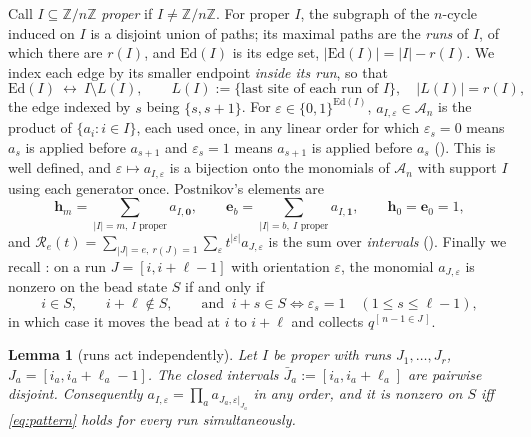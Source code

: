 \documentclass[11pt]{article}
\theoremstyle{plain}
\newtheorem{lemma}[theorem]{Lemma}
\theoremstyle{definition}
\newcommand{\A}{\mathscr{A}}
\newcommand{\ZZ}{\mathbb{Z}}
\newcommand{\bh}{\mathbf h}
\newcommand{\be}{\mathbf e}
\begin{document}
Call $I\subseteq\ZZ/n\ZZ$ \emph{proper} if $I\ne\ZZ/n\ZZ$.  For proper $I$, the
subgraph of the $n$-cycle induced on $I$ is a disjoint union of paths; its
maximal paths are the \emph{runs} of $I$, of which there are $r(I)$, and
$\mathrm{Ed}(I)$ is its edge set, $|\mathrm{Ed}(I)|=|I|-r(I)$.  We index each
edge by its smaller endpoint \emph{inside its run}, so that
\begin{equation}\label{eq:edgeindex}
\mathrm{Ed}(I)\ \longleftrightarrow\ I\setminus L(I),
\qquad
L(I):=\{\text{last site of each run of }I\},\quad |L(I)|=r(I),
\end{equation}
the edge indexed by $s$ being $\{s,s+1\}$.  For
$\varepsilon\in\{0,1\}^{\mathrm{Ed}(I)}$, $a_{I,\varepsilon}\in\A_n$ is the
product of $\{a_i:i\in I\}$, each used once, in any linear order for which
$\varepsilon_s=0$ means $a_s$ is applied before $a_{s+1}$ and $\varepsilon_s=1$
means $a_{s+1}$ is applied before $a_s$ (\cite[\texttt{def:aIeps}]{Clio201}).  This is
well defined, and $\varepsilon\mapsto a_{I,\varepsilon}$ is a bijection onto the
monomials of $\A_n$ with support $I$ using each generator once.  Postnikov's
elements are
\begin{equation}\label{eq:heDef}
\bh_m=\sum_{|I|=m,\ I\text{ proper}}a_{I,\mathbf 0},
\qquad
\be_b=\sum_{|I|=b,\ I\text{ proper}}a_{I,\mathbf 1},
\qquad \bh_0=\be_0=1,
\end{equation}
and $\mathcal R_e(t)=\sum_{|J|=e,\ r(J)=1}\sum_\varepsilon
t^{|\varepsilon|}a_{J,\varepsilon}$ is the sum over \emph{intervals}
(\cite[\texttt{eq:Rdef}]{Clio201}).  Finally we recall
\cite[\texttt{lem:run}]{Clio201}: on a run $J=[i,i+\ell-1]$ with orientation
$\varepsilon$, the monomial $a_{J,\varepsilon}$ is nonzero on the bead state $S$
if and only if
\begin{equation}\label{eq:pattern}
i\in S,\qquad i+\ell\notin S,\qquad
\text{and }\ i+s\in S\iff\varepsilon_s=1\quad(1\le s\le \ell-1),
\end{equation}
in which case it moves the bead at $i$ to $i+\ell$ and collects
$q^{[\,n-1\in J\,]}$.

\begin{lemma}[runs act independently]\label{lem:runsdisjoint}
Let $I$ be proper with runs $J_1,\dots,J_{r}$, $J_a=[i_a,i_a+\ell_a-1]$.  The
\emph{closed} intervals $\bar J_a:=[i_a,i_a+\ell_a]$ are pairwise disjoint.
Consequently $a_{I,\varepsilon}=\prod_a a_{J_a,\varepsilon|_{J_a}}$ in any
order, and it is nonzero on $S$ iff \eqref{eq:pattern} holds for every run
simultaneously.
\end{lemma}
\end{document}
